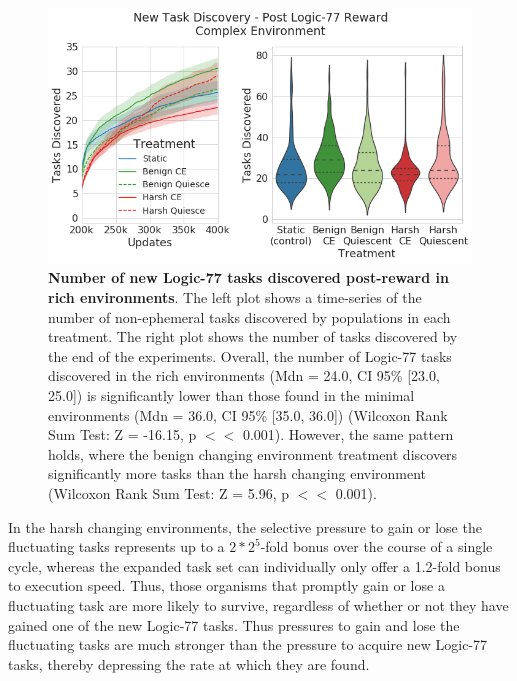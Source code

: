 \documentclass[PhD]{msu-thesis}
\begin{document}
	\begin{figure}[!h]
	\includegraphics[width=0.95\columnwidth]{figures/LTE/lte-complex-post_reward_task_discovery.png}
	\caption{\textbf{Number of new Logic-77 tasks discovered post-reward in rich environments}. The left plot shows a time-series of the number of non-ephemeral tasks discovered by populations in each treatment. The right plot shows the number of tasks discovered by the end of the experiments. Overall, the number of Logic-77 tasks discovered in the rich environments (Mdn = 24.0, CI 95\% [23.0, 25.0]) is significantly lower than those found in the minimal environments (Mdn = 36.0, CI 95\% [35.0, 36.0]) (Wilcoxon Rank Sum Test: Z = -16.15, p $<<$ 0.001). However, the same pattern holds, where the benign changing environment treatment discovers significantly more tasks than the harsh changing environment (Wilcoxon Rank Sum Test: Z = 5.96, p $<<$ 0.001).%
	}
	\label{fig:complex-task_discovery}
	\end{figure}
In the harsh changing environments, the selective pressure to gain or lose the fluctuating tasks represents up to a $2 * 2^5$-fold bonus over the course of a single cycle, whereas the expanded task set can individually only offer a 1.2-fold bonus to execution speed. Thus, those organisms that promptly gain or lose a fluctuating task are more likely to survive, regardless of whether or not they have gained one of the new Logic-77 tasks. Thus pressures to gain and lose the fluctuating tasks are much stronger than the pressure to acquire new Logic-77 tasks, thereby depressing the rate at which they are found.
\end{document}
